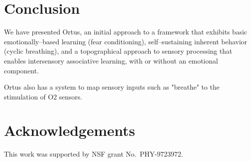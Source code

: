 \documentclass[letterpaper]{article}
\begin{document}
\section{Conclusion}
We have presented Ortus, an initial approach to a framework that exhibits basic emotionally--based learning (fear conditioning), self--sustaining inherent behavior (cyclic breathing), and a topographical approach to sensory processing that enables intersensory associative learning, with or without an emotional component.

Ortus also has a system to map sensory inputs such as "breathe" to the stimulation of O2 sensors.






\section{Acknowledgements}

This work was supported by NSF grant No.\ PHY-9723972.

\footnotesize

\end{document}
